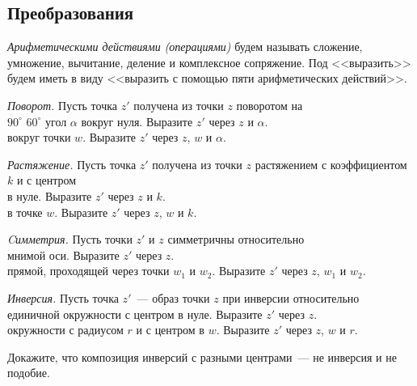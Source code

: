 

\subsection*{Преобразования}

\emph{Арифметическими действиями}
\emph{(операциями)}
будем называть сложение, умножение, вычитание, деление и комплексное
сопряжение.
Под <<выразить>> будем иметь в виду
<<выразить с помощью пяти арифметических действий>>.

\begin{problems}

\item
\emph{Поворот.}
Пусть точка $z'$ получена из точки $z$ поворотом на
\\
\sbp
$90^\circ$
\quad
\sbp
$60^\circ$
\quad
\sbp
угол $\alpha$
\quad
вокруг нуля. Выразите $z'$ через $z$ и $\alpha$.
\\
\sbp вокруг точки $w$.  Выразите $z'$ через $z$, $w$ и $\alpha$.

\item
\emph{Растяжение.}
Пусть точка $z'$ получена из точки $z$ растяжением с коэффициентом $k$ и с
центром
\\
\sbp в нуле. Выразите $z'$ через $z$ и $k$.
\\
\sbp в точке $w$. Выразите $z'$ через $z$, $w$ и $k$.

\item
\emph{Cимметрия.}
Пусть точки $z'$ и $z$ симметричны относительно
\\
\sbp
мнимой оси.
Выразите $z'$ через $z$.
\\
\sbp
прямой, проходящей через точки $w_1$ и $w_2$.
Выразите $z'$ через $z$, $w_1$ и $w_2$.

\item
\emph{Инверсия.}
Пусть точка $z'$~--- образ точки $z$ при инверсии относительно
\\
\sbp
единичной окружности с центром в нуле.
Выразите $z'$ через $z$.
\\
\sbp
окружности с радиусом $r$ и с центром в $w$.
Выразите $z'$ через $z$, $w$ и $r$.

\item
Докажите, что композиция инверсий с разными центрами~--- не инверсия и не
подобие.

\end{problems}


